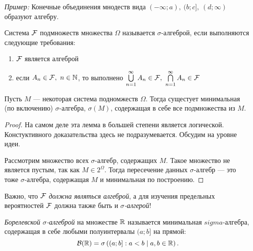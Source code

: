 \begin{itemize}
\begin{definition}
            \textit{Пример:} Конечные объединения мнодеств вида \( (-\infty; a),\ (b; c],\ (d; \infty) \) образуют алгебру.
           
        \end{definition}
    
        \begin{definition}
            Система $ \mathcal{F} $ подмножеств множества $ \Omega $ называется $ \sigma $-алгеброй, если выполняются следующие требования:
            
            \begin{enumerate}
                \item $ \mathcal{F} $ является алгеброй      
                
                \item если \(A_n \in \mathcal{F},\ n \in \mathbb{N} \), то выполнено \(\bigcup\limits_{n = 1}^{\infty}A_n \in \mathcal{F}, \ \bigcap\limits_{n = 1}^{\infty}A_n \in \mathcal{F} \)  
            \end{enumerate}
        
        \end{definition}
    
        \begin{lemma}
            Пусть $ M $ --- некоторая система подномжеств $ \Omega $. Тогда сущестует минимальная (по включению) $ \sigma $-алгебра, $ \sigma(M) $, содержащая в себе все подмножества из $ M $.
        \end{lemma}
    
        \begin{proof}
            На самом деле эта лемма в большей степени является логической. Констуктивного доказательства здесь не подразумевается. Обсудим на уровне идеи.
            
            Рассмотрим множество всех $\sigma$-алгебр, содержащих $ M $. Такое множество не является пустым, так как \(M \in 2^{\Omega}\). Тогда пересечение данных $ \sigma $-алгебр --- это тоже $ \sigma $-алгебра, содержащая $ M $ и минимальная по построению.
        \end{proof}
        
    Важно, что $ \mathcal{F} $ \emph{должна являться алгеброй}, а для изучения предельных вероятностей $ \mathcal{F} $ должна также быть и \emph{$ \sigma $-алгерой}!
    
        \begin{definition}
            \emph{Борелевской $ \sigma $-алгеброй} на множестве $ \mathbb{R} $ называется минимальная $ sigma $-алгебра, содержащая в себе любыми полуинтервалы \((a; b] \) на прямой:
            \[
                \mathcal{B}(\mathbb{R}) = \sigma\left((a; b] : a < b \mid a, b \in \mathbb{R} \right).
            \]
        \end{definition} 
    

\end{itemize}
